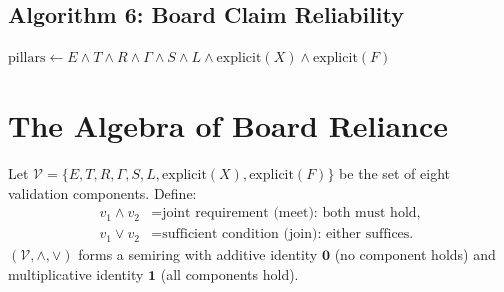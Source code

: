 \subsection{Algorithm 6: Board Claim Reliability}
\label{sec:pi-alg6}

\begin{algorithm}[H]
\caption{Board Claim Reliability Assessment}
\label{alg:board-reliability}
\DontPrintSemicolon
{}
\BlankLine
{}
$\mathrm{pillars} \leftarrow
  E \wedge T \wedge R \wedge \Gamma \wedge S \wedge L \wedge
  \mathrm{explicit}(X) \wedge \mathrm{explicit}(F)$\;
\BlankLine
{}
\BlankLine
{}
\end{algorithm}

\section{The Algebra of Board Reliance}
\label{sec:pi-algebra}

\begin{definition}
\label{def:semiring}
Let $\mathcal{V} = \{E, T, R, \Gamma, S, L, \mathrm{explicit}(X),
\mathrm{explicit}(F)\}$ be the set of eight validation components. Define:
\begin{align*}
  v_1 \wedge v_2 &= \text{joint requirement (meet): both must hold,} \\
  v_1 \vee v_2   &= \text{sufficient condition (join): either suffices.}
\end{align*}
$(\mathcal{V}, \wedge, \vee)$ forms a semiring with
additive identity $\mathbf{0}$ (no component holds) and multiplicative
identity $\mathbf{1}$ (all components hold).
\end{definition}

